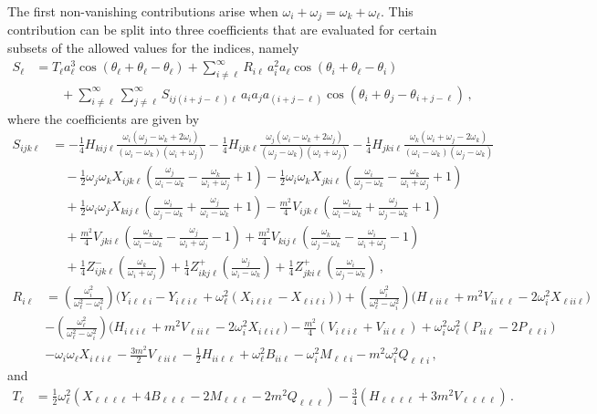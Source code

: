\documentclass[letterpaper,11pt]{article}
\newcommand{\oi}{\omega_i}
\newcommand{\oj}{\omega_j}
\newcommand{\ok}{\omega_k}
\newcommand{\ol}{\omega_\ell}
\newcommand{\thi}{\theta_i}
\newcommand{\thj}{\theta_j}
\newcommand{\thl}{\theta_\ell}
\begin{document}
The first non-vanishing contributions arise when $\oi + \oj = \ok + \ol$. This contribution can be split into three coefficients that are evaluated for certain subsets of the allowed values for the indices, namely
\begin{align}
S_\ell &= T_\ell a^3_\ell \cos (\thl + \thl - \thl) + \sum_{i \neq \ell}^\infty R_{i \ell} \, a^2_i a_\ell \cos(\thi + \thl - \thi) \nonumber \\
& \qquad + \sum_{i \neq \ell}^\infty \sum_{j \neq \ell}^\infty S_{i j (i + j - \ell) \ell} \, a_i a_j a_{(i + j - \ell)} \cos(\thi + \thj - \theta_{i + j -\ell} ) \, ,
\end{align}
where the coefficients are given by
\begin{align}
\label{S_ppm}
S_{ijk\ell} &= - \frac{1}{4} H_{kij\ell} \frac{\oi (\oj - \ok + 2\oi)}{(\oi - \ok)(\oi + \oj)} -\frac{1}{4} H_{ijk\ell} \frac{\oj (\oi - \ok + 2\oj)}{(\oj - \ok)(\oi + \oj)} - \frac{1}{4} H_{jki\ell} \frac{\ok ( \oi + \oj - 2\ok)}{(\oi - \ok)(\oj - \ok)} \nonumber \\
%
& \quad - \frac{1}{2} \oj \ok X_{ijk\ell} \left( \frac{\oj}{\oi - \ok} - \frac{\ok}{\oi + \oj} + 1 \right) - \frac{1}{2} \oi \ok X_{jki\ell} \left( \frac{\oi}{\oj - \ok} - \frac{\ok}{\oi + \oj} + 1 \right) \nonumber \\
%
& \quad + \frac{1}{2} \oi \oj X_{kij\ell} \left( \frac{\oi}{\oj - \ok} + \frac{\oj}{\oi - \ok} + 1 \right) - \frac{m^2}{4} V_{ijk\ell} \left( \frac{\oi}{\oi - \ok} + \frac{\oj}{\oj - \ok} + 1\right) \nonumber \\
%
& \quad + \frac{m^2}{4} V_{jki\ell} \left( \frac{\ok}{\oi - \ok} - \frac{\oj}{\oi + \oj} - 1 \right) + \frac{m^2}{4} V_{kij\ell} \left( \frac{\ok}{\oj - \ok} - \frac{\oi}{\oi + \oj} - 1 \right) \nonumber \\
%
& \quad + \frac{1}{4}  Z^-_{ijk\ell} \left( \frac{\ok}{\oi + \oj}\right)  + \frac{1}{4}  Z^+_{ikj\ell} \left( \frac{\oj}{\oi - \ok}\right) + \frac{1}{4} Z^+_{jki\ell} \left( \frac{\oi}{\oj - \ok} \right) \, ,
\end{align}
\begin{align}
\label{R_ppm}
R_{i\ell} &= \left(\frac{\oi^2}{\ol^2 - \oi^2} \right) \big( Y_{i\ell \ell i} - Y_{i\ell i \ell} + \ol^2 ( X_{i\ell i \ell} - X_{\ell i \ell i}) \big) + \left(\frac{\oi^2}{\ol^2 - \oi^2}\right) \big( H_{\ell i i\ell} + m^2 V_{ii\ell \ell} - 2\oi^2 X_{\ell i i \ell} \big) \nonumber \\
%
& - \left(\frac{\ol^2}{\ol^2 - \oi^2} \right) \big( H_{i\ell i \ell} + m^2 V_{\ell i i \ell} - 2\oi^2 X_{i\ell i\ell} \big) - \frac{m^2}{4}(V_{i\ell i \ell} + V_{ii\ell \ell} ) + \oi^2 \ol^2 (P_{ii\ell} - 2P_{\ell \ell i}) \nonumber \\
%
& - \oi\ol X_{i\ell i \ell} - \frac{3m^2}{2} V_{\ell ii \ell} - \frac{1}{2} H_{ii\ell \ell} + \ol^2 B_{ii\ell} - \oi^2 M_{\ell \ell i} - m^2 \oi^2 Q_{\ell \ell i} \, ,
\end{align}
and
\begin{align}
\label{T_ppm}
T_{\ell} &= \frac{1}{2} \ol^2 \left( X_{\ell \ell \ell \ell} + 4 B_{\ell \ell \ell} -2 M_{\ell \ell \ell} - 2m^2 Q_{\ell \ell \ell} \right) -\frac{3}{4} \left( H_{\ell \ell \ell \ell} + 3m^2 V_{\ell \ell \ell \ell} \right) \, .
\end{align}
\end{document}
